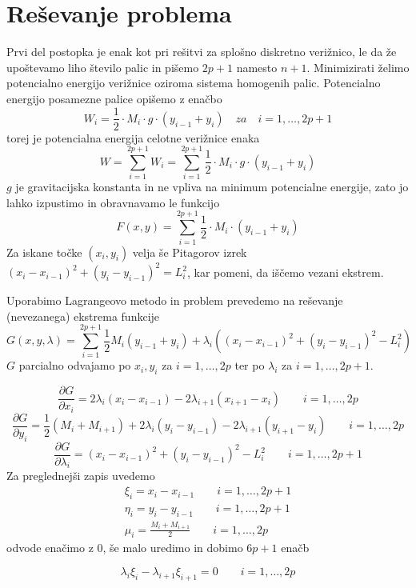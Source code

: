 \documentclass[A4paper, 11pt]{article}
\begin{document}
\section{Reševanje problema}

Prvi del postopka je enak kot pri rešitvi za splošno diskretno verižnico, le da že upoštevamo liho število palic in pišemo $2p+1$ namesto $n+1$. 
Minimizirati želimo potencialno energijo verižnice oziroma sistema homogenih palic. Potencialno energijo posamezne palice opišemo z enačbo
\[ W_i = \frac{1}{2} \cdot M_i \cdot g \cdot (y_{i-1} + y_i) \quad za \quad i=1, \ldots, 2p+1 \]
torej je potencialna energija celotne verižnice enaka
\[ W = \sum_{i=1}^{2p+1} W_i = \sum_{i=1}^{2p+1} \frac{1}{2} \cdot M_i \cdot g \cdot (y_{i-1} + y_i) \]
$g$ je gravitacijska konstanta in ne vpliva na minimum potencialne energije, zato jo lahko izpustimo in obravnavamo le funkcijo
\[ F(x,y) = \sum_{i=1}^{2p+1} \frac{1}{2} \cdot M_i \cdot (y_{i-1} + y_i) \]
Za iskane točke $(x_i,y_i)$ velja še Pitagorov izrek $(x_i - x_{i-1})^2 + (y_i - y_{i-1})^2 = L_i ^2$, kar pomeni, da iščemo vezani ekstrem. 

Uporabimo Lagrangeovo metodo in problem prevedemo na reševanje (nevezanega) ekstrema funkcije
\[ G(x,y,\lambda) = \sum_{i=1}^{2p+1} \frac{1}{2} M_i (y_{i-1} + y_i) + \lambda_i ((x_i - x_{i-1})^2 + (y_i - y_{i-1})^2 - L_i ^2) \]
$G$ parcialno odvajamo po $x_i, y_i$ za $i=1, \ldots, 2p$ ter po $\lambda_i$ za $i=1, \ldots, 2p+1$.

\[ \frac{\partial G}{\partial x_i} = 2\lambda_i (x_i - x_{i-1}) - 2\lambda_{i+1} (x_{i+1} - x_i) \qquad i=1, \ldots, 2p \]
\[ \frac{\partial G}{\partial y_i} = \frac{1}{2} (M_i + M_{i+1}) + 2\lambda_i (y_i - y_{i-1}) - 2\lambda_{i+1} (y_{i+1} - y_i) \qquad  i=1, \ldots, 2p \]
\[ \frac{\partial G}{\partial \lambda_i} = (x_i - x_{i-1})^2 + (y_i - y_{i-1})^2 - L_i ^2 \qquad i=1, \ldots, 2p+1 \]
Za preglednejši zapis uvedemo 
\begin{equation}
\begin{split}
\xi_i = x_i - x_{i-1} \qquad i=1, \ldots, 2p+1 \\
\eta_i = y_i - y_{i-1} \qquad i=1, \ldots, 2p+1 \\
\mu_i = \frac{M_i + M_{i+1}}{2} \qquad i=1, \ldots, 2p
\end{split}
\end{equation}
odvode enačimo z 0, še malo uredimo in dobimo $6p+1$ enačb

\begin{equation}
\lambda_i \xi_i - \lambda_{i+1} \xi_{i+1} = 0 \qquad i=1, \ldots, 2p 
\end{equation}
\end{document}
